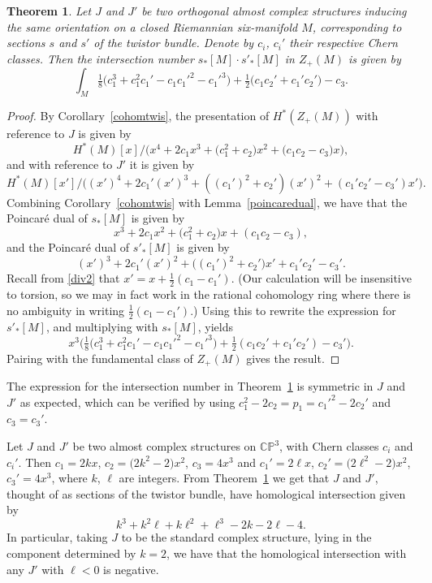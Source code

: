 \documentclass[pdftex]{sigma}%
\newcommand{\CP}{\mathbb{CP}}
\numberwithin{equation}{section}
\newtheorem{Theorem}{Theorem}[section]
\begin{document}
\begin{Theorem}\label{intersection} Let $J$ and $J'$ be two orthogonal almost complex structures inducing the same orientation on a closed Riemannian six-manifold $M$, corresponding to sections $s$ and $s'$ of the twistor bundle. Denote by $c_i$, $c_i'$ their respective Chern classes. Then the intersection number $s_*[M] \cdot s'_*[M]$ in $Z_+(M)$ is given by \[\int_M \tfrac{1}{8}\big( c_1^3 + c_1^2 c_1' - c_1c_1'^2 - c_1'^3 \big) + \tfrac{1}{2} \big( c_1 c_2' + c_1' c_2' \big) - c_3.\]
\end{Theorem}

\begin{proof}
By Corollary~\ref{cohomtwis}, the presentation of $H^*(Z_+(M))$ with reference to $J$ is given by \[H^*(M)[x]/\big(x^4 + 2c_1x^3 + \big(c_1^2+c_2\big)x^2 + \big(c_1c_2-c_3\big)x\big),\] and with reference to $J'$ it is given by \[H^*(M)[x']/\big((x')^4 + 2c_1'(x')^3 + ((c_1')^2 + c_2')(x')^2 + (c_1'c_2'-c_3')x'\big).\] Combining Corollary~\ref{cohomtwis} with Lemma~\ref{poincaredual}, we have that the Poincar\'e dual of $s_*[M]$ is given by \[x^3 + 2c_1x^2 + \big(c_1^2+c_2\big)x + (c_1c_2-c_3),\] and the Poincar\'e dual of $s'_*[M]$ is given by \[(x')^3 + 2c_1'(x')^2 + \big((c_1')^2 + c_2'\big)x' + c_1'c_2'-c_3'.\] Recall from \eqref{div2} that $x' = x + \tfrac{1}{2}(c_1 - c_1')$. (Our calculation will be insensitive to torsion, so we may in fact work in the rational cohomology ring where there is no ambiguity in writing $\tfrac{1}{2}(c_1 - c_1')$.) Using this to rewrite the expression for $s'_*[M]$, and multiplying with $s_*[M]$, yields \[x^3\big( \tfrac{1}{8}\big( c_1^3 + c_1^2 c_1' - c_1c_1'^2 - c_1'^3 \big) + \tfrac{1}{2} ( c_1 c_2' + c_1' c_2' ) - c_3' \big).\] Pairing with the fundamental class of $Z_+(M)$ gives the result. \end{proof}


\begin{Remark} The expression for the intersection number in Theorem~\ref{intersection} is symmetric in $J$ and $J'$ as expected, which can be verified by using $c_1^2 - 2c_2 = p_1 = c_1'^2 - 2c_2'$ and $c_3 = c_3'$. \end{Remark}

\begin{Example} Let $J$ and $J'$ be two almost complex structures on $\CP^3$, with Chern classes $c_i$ and $c_i'$. Then $c_1 = 2kx$, $c_2 = \big(2k^2 - 2\big)x^2$, $c_3 = 4x^3$ and $c_1' = 2\ell x$, $c_2' = \big(2\ell^2 - 2\big)x^2$, $c_3' = 4x^3$, where $k$, $\ell$ are integers. From Theorem~\ref{intersection} we get that $J$ and $J'$, thought of as sections of the twistor bundle, have homological intersection given by \[k^3 + k^2 \ell + k \ell^2 + \ell^3 - 2k - 2\ell - 4.\] In particular, taking $J$ to be the standard complex structure, lying in the component determined by $k = 2$, we have that the homological intersection with any $J'$ with $\ell < 0$ is negative.
\end{Example}
\end{document}
